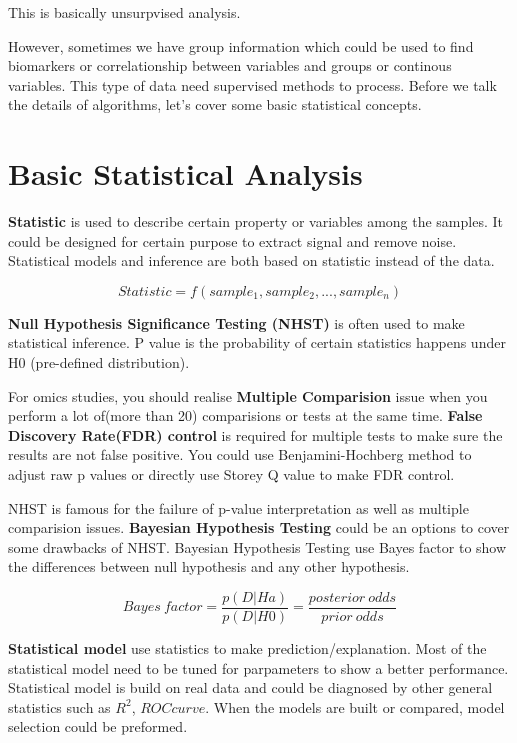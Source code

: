 \documentclass[
]{book}
\begin{document}
This is basically unsurpvised analysis.

However, sometimes we have group information which could be used to find biomarkers or correlationship between variables and groups or continous variables. This type of data need supervised methods to process. Before we talk the details of algorithms, let's cover some basic statistical concepts.

\hypertarget{basic-statistical-analysis}{%
\section{Basic Statistical Analysis}\label{basic-statistical-analysis}}

\textbf{Statistic} is used to describe certain property or variables among the samples. It could be designed for certain purpose to extract signal and remove noise. Statistical models and inference are both based on statistic instead of the data.

\[Statistic = f(sample_1,sample_2,...,sample_n)\]

\textbf{Null Hypothesis Significance Testing (NHST)} is often used to make statistical inference. P value is the probability of certain statistics happens under H0 (pre-defined distribution).

For omics studies, you should realise \textbf{Multiple Comparision} issue when you perform a lot of(more than 20) comparisions or tests at the same time. \textbf{False Discovery Rate(FDR) control} is required for multiple tests to make sure the results are not false positive. You could use Benjamini-Hochberg method to adjust raw p values or directly use Storey Q value to make FDR control.

NHST is famous for the failure of p-value interpretation as well as multiple comparision issues. \textbf{Bayesian Hypothesis Testing} could be an options to cover some drawbacks of NHST. Bayesian Hypothesis Testing use Bayes factor to show the differences between null hypothesis and any other hypothesis.

\[Bayes\ factor = \frac{p(D|Ha)}{p(D|H0)} = \frac{posterior\ odds}{prior\ odds}\]

\textbf{Statistical model} use statistics to make prediction/explanation. Most of the statistical model need to be tuned for parpameters to show a better performance. Statistical model is build on real data and could be diagnosed by other general statistics such as \(R^2\), \(ROC curve\). When the models are built or compared, model selection could be preformed.
\end{document}
